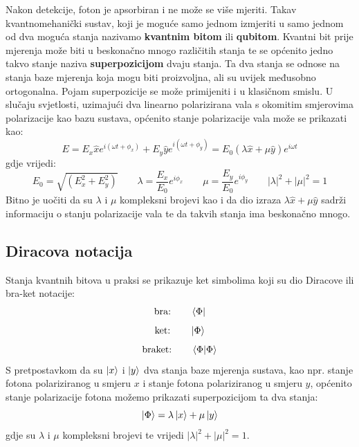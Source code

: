 Nakon detekcije, foton je apsorbiran i ne može se više mjeriti. Takav kvantnomehanički sustav, koji je moguće samo jednom izmjeriti u samo jednom od dva moguća stanja nazivamo \textbf{kvantnim bitom} ili \textbf{qubitom}.
Kvantni bit prije mjerenja može biti u beskonačno mnogo različitih stanja te se općenito jedno takvo stanje naziva \textbf{superpozicijom} dvaju stanja. Ta dva stanja se odnose na stanja baze mjerenja koja mogu biti proizvoljna, ali su uvijek međusobno ortogonalna. Pojam superpozicije se može primijeniti i u klasičnom smislu. U slučaju svjetlosti, uzimajući dva linearno polarizirana vala s okomitim smjerovima polarizacije kao bazu sustava, općenito stanje polarizacije vala može se prikazati kao:
\begin{equation}
E = E_x \hat{x}e^{i(\omega t + \phi_x)} + E_y \hat{y}e^{i(\omega t + \phi_y)} = E_0(\lambda \hat{x} + \mu \hat{y})e^{i\omega t}
\end{equation}
gdje vrijedi:
\begin{equation}
E_0 = \sqrt{(E_x^2 + E_y^2)}
\qquad
\lambda = \frac{E_x}{E_0}e^{i\phi_x}
\qquad
\mu = \frac{E_y}{E_0}e^{i\phi_y}
\qquad
|\lambda|^2 + |\mu|^2 = 1
\end{equation}
Bitno je uočiti da su $\lambda$ i $\mu$ kompleksni brojevi kao i da dio izraza $\lambda\hat{x}+\mu\hat{y}$ sadrži informaciju o stanju polarizacije vala te da takvih stanja ima beskonačno mnogo.

\subsection{Diracova notacija}
Stanja kvantnih bitova u praksi se prikazuje ket simbolima koji su dio Diracove ili bra-ket notacije:
\[
\text{bra:}
\qquad
\bra{\Phi}
\]
\[
\text{ket:}
\qquad
\ket{\Phi}
\]
\[
\text{braket:}
\qquad
\braket{\Phi|\Phi}
\]
S pretpostavkom da su $\ket{x}$ i $\ket{y}$ dva stanja baze mjerenja sustava, kao npr. stanje fotona polariziranog u smjeru $x$ i stanje fotona polariziranog u smjeru $y$, općenito stanje polarizacije fotona možemo prikazati superpozicijom ta dva stanja:
\[
\ket{\Phi} = \lambda\ket{x} + \mu\ket{y}
\]
gdje su $\lambda$ i $\mu$ kompleksni brojevi te vrijedi $|\lambda|^2 + |\mu|^2 = 1$.

